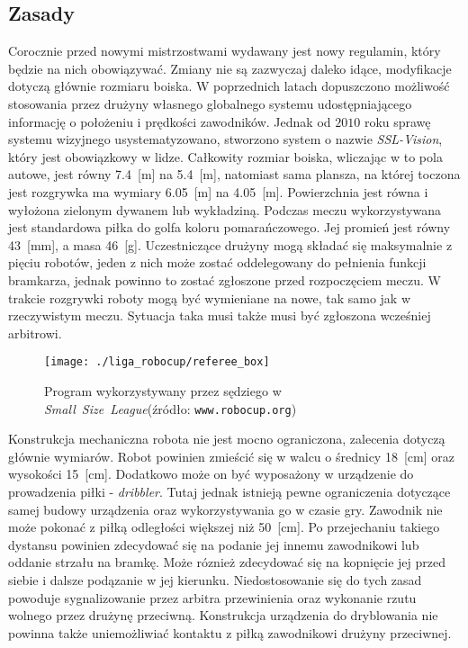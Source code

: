 	\subsection{Zasady}
	Corocznie przed nowymi mistrzostwami wydawany jest nowy regulamin, który będzie na nich obowiązywać. Zmiany nie są zazwyczaj daleko idące, modyfikacje dotyczą głównie rozmiaru boiska.
	W poprzednich latach dopuszczono możliwość stosowania przez drużyny własnego globalnego systemu udostępniającego informację o położeniu i prędkości zawodników.
	Jednak od $2010$ roku sprawę systemu wizyjnego usystematyzowano, stworzono system o nazwie \textit{SSL-Vision}, który jest obowiązkowy w lidze. 
	Całkowity rozmiar boiska, wliczając w to pola autowe, jest równy 7.4~[m] na 5.4~[m], natomiast sama plansza, na której toczona jest rozgrywka ma wymiary 6.05~[m] na 4.05~[m].
	Powierzchnia jest równa i  wyłożona zielonym dywanem lub wykładziną. Podczas meczu wykorzystywana jest standardowa piłka do golfa koloru pomarańczowego. Jej promień jest równy 43~[mm], a masa
	46~[g].
	Uczestniczące drużyny mogą składać się maksymalnie z pięciu robotów, jeden z nich może zostać oddelegowany do pełnienia
	funkcji bramkarza, jednak powinno to zostać zgłoszone przed rozpoczęciem meczu. W trakcie rozgrywki roboty mogą być wymieniane na nowe, tak samo jak w rzeczywistym meczu.  
	Sytuacja taka musi także musi być zgłoszona wcześniej arbitrowi.
	\begin{figure}[h!]
	\centering
	\texttt{[image: ./liga\_robocup/referee\_box]}
	\caption{Program wykorzystywany przez sędziego w  \mbox{\emph{Small Size League}}\newline(źródło: \texttt{www.robocup.org}) }
	\label{fig:referee_box}
	\end{figure} 
	Konstrukcja mechaniczna robota nie jest mocno ograniczona, zalecenia dotyczą głównie wymiarów. Robot powinien zmieścić się w walcu o średnicy 18~[cm] oraz wysokości 15~[cm].
	Dodatkowo może on być wyposażony w urządzenie do prowadzenia piłki - \textit{dribbler}. Tutaj jednak istnieją pewne ograniczenia dotyczące
	samej budowy urządzenia oraz wykorzystywania go w czasie gry. Zawodnik nie może pokonać z piłką odległości większej niż 50~[cm]. Po przejechaniu takiego dystansu powinien zdecydować się
	na podanie jej innemu zawodnikowi lub oddanie strzału na bramkę. Może róznież zdecydować się na kopnięcie jej przed siebie i dalsze podązanie w jej kierunku. Niedostosowanie się do tych zasad powoduje sygnalizowanie przez arbitra
	przewinienia oraz wykonanie rzutu wolnego przez drużynę przeciwną. Konstrukcja urządzenia do dryblowania nie powinna także uniemożliwiać kontaktu z piłką zawodnikowi drużyny przeciwnej.


